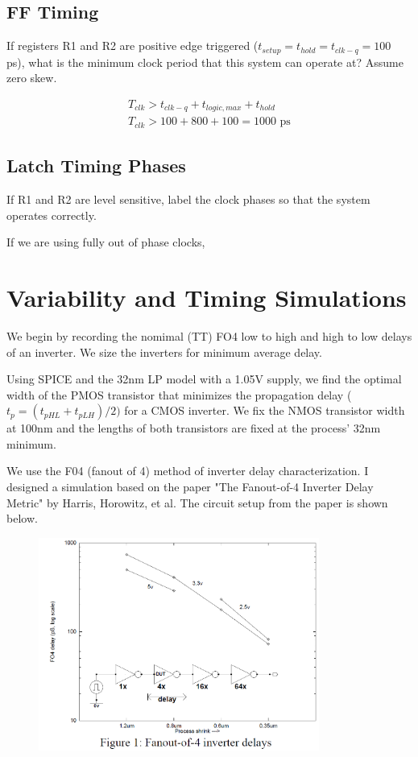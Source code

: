 \documentclass[11pt]{article}
\begin{document}
\subsection{FF Timing}
If registers R1 and R2 are positive edge triggered ($t_{setup} = t_{hold} = t_{clk-q} = 100$ ps), what is the minimum clock period that this system can operate at? Assume zero skew.

\begin{eqnarray}
	T_{clk} > t_{clk-q} + t_{logic,max} + t_{hold} \nonumber \\
	T_{clk} > 100 + 800 + 100 = 1000 \text{ ps} \nonumber
\end{eqnarray}

\subsection{Latch Timing Phases}
If R1 and R2 are level sensitive, label the clock phases so that the system operates correctly.

If we are using fully out of phase clocks, 

\section{Variability and Timing Simulations}

We begin by recording the nomimal (TT) FO4 low to high and high to low delays of an inverter. We size the inverters for minimum average delay.

Using SPICE and the 32nm LP model with a 1.05V supply, we find the optimal width of the PMOS transistor that minimizes the propagation delay ($t_{p} = (t_{pHL} + t_{pLH}) / 2)$ for a CMOS inverter. We fix the NMOS transistor width at 100nm and the lengths of both transistors are fixed at the process' 32nm minimum.

We use the F04 (fanout of 4) method of inverter delay characterization. I designed a simulation based on the paper "The Fanout-of-4 Inverter Delay Metric" by Harris, Horowitz, et al. The circuit setup from the paper is shown below.

\begin{figure}[H]
	\centerline{\includegraphics[height=7cm]{images/f04_figure.png}}
\end{figure}
\end{document}
